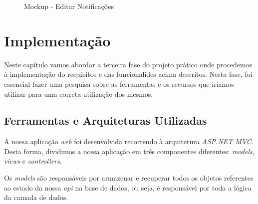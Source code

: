\documentclass[a4paper,12pt]{scrreprt}
\newcommand{\tab}{
    \hspace{1cm}}
\begin{document}
\begin{figure}[hbt!]
    \centering
    \caption{Mockup - Editar Notificações}
\end{figure}
\clearpage


\chapter{Implementação}

\tab Neste capítulo vamos abordar a terceira fase do projeto prático onde procedemos à implementação do requisitos e das funcionalides acima descritos. Nesta fase, foi essencial fazer uma pesquisa sobre as ferramentas e os recursos que iríamos utilizar para uma correta utilização dos mesmos.

\section{Ferramentas e Arquiteturas Utilizadas}

\tab A nossa aplicação \textit{web} foi desenvolvida recorrendo à arquitetura \textit{ASP.NET MVC}. Desta forma, dividimos a nossa aplicação em três componentes diferentes: \textit{models}, \textit{views} e \textit{controllers}.

\tab Os \textit{models} são responsáveis por armazenar e recuperar todos os objetos referentes ao estado da nossa \textit{api} na base de dados, ou seja, é responsável por toda a lógica da camada de dados.
\end{document}
